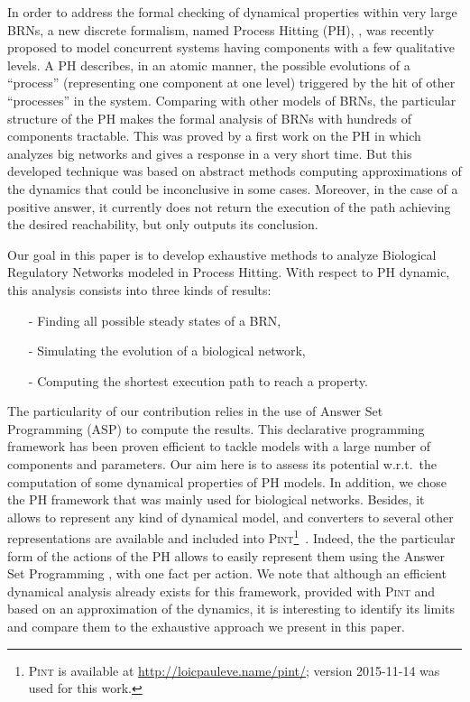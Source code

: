 In order to address the formal checking of dynamical properties within very large BRNs, a new discrete formalism, named Process Hitting (PH), \cite{PMR10-TCSB}, was recently proposed to model concurrent systems having components with a few qualitative levels. A PH describes, in an atomic manner, the possible evolutions of a ``process'' (representing one component at one level) triggered by the hit of other ``processes'' in the system. Comparing with other models of BRNs, the particular structure of the PH makes the formal analysis of BRNs with hundreds of components tractable. This was proved by a first work on the PH in \cite{PMR12-MSCS} which analyzes big networks and gives a response in a very short time. But this developed technique was based on abstract methods computing approximations of the dynamics that could be inconclusive in some cases. Moreover, in the case of a positive answer, it currently does not return the execution of the path achieving the desired reachability, but only outputs its conclusion.

Our goal in this paper is to develop exhaustive methods to analyze Biological Regulatory Networks modeled in Process Hitting. With respect to PH dynamic, this analysis consists into three kinds of results:
\begin{itemize}
\item[-] Finding all possible steady states of a BRN,
\item[-] Simulating the evolution of a biological network,
\item[-] Computing the shortest execution path to reach a property.
\end{itemize}

 The particularity of our contribution relies in the use of Answer Set Programming
(ASP) \cite{baral2003knowledge}
to compute the results.
This declarative programming framework has been proven efficient
to tackle models with a large number of components and parameters.
Our aim here is to assess its potential w.r.t.\ the computation
of some dynamical properties of PH models. In addition, we chose the PH framework that was mainly used for biological networks. Besides, it allows to represent any kind of dynamical model,
and converters to several other representations are available and included into \textsc{Pint}\footnote{\textsc{Pint} is available at \url{http://loicpauleve.name/pint/}; version 2015-11-14 was used for this work.}~\cite{PMR12-MSCS}.
Indeed, the the particular form of the actions of the PH allows
to easily represent them using the Answer Set Programming \cite{Baral03, Vladimir, Glimpse, sureshkumar2006ansprolog},
with one fact per action.
We note that although an efficient dynamical analysis already exists for this framework,
provided with \textsc{Pint} and based on an approximation of the dynamics,
it is interesting to identify its limits
and compare them to the exhaustive approach we present in this paper.